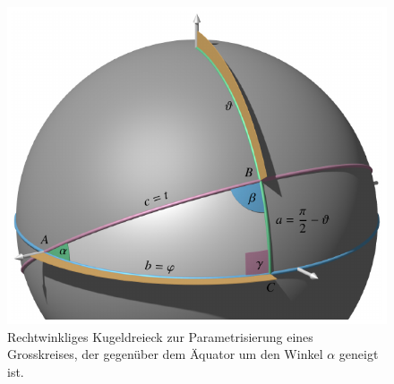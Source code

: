 %
%
%
\begin{figure}
\centering
\includegraphics{chapters/100-zusammenhang/images/kugeldreieck.pdf}
\caption{Rechtwinkliges Kugeldreieck zur Parametrisierung eines
Grosskreises, der gegenüber dem Äquator um den Winkel $\alpha$ geneigt
ist.
\label{buch:zusammenhang:geodaeten:fig:kugeldreieck}}
\end{figure}
